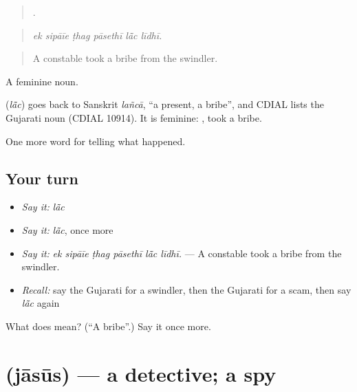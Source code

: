 \begin{quote}
     .
\end{quote}

\begin{quote}
\emph{ek sipāīe ṭhag pāsethī lā̃c līdhī.}
\end{quote}

\begin{quote}
A constable took a bribe from the swindler.
\end{quote}

A feminine noun.

\begin{cousinweb}
\textbf{} (\emph{lā̃c}) goes back to Sanskrit \emph{lañcā}, \textquotedblleft{}a present, a bribe\textquotedblright{}, and CDIAL lists the Gujarati noun (CDIAL 10914). It is feminine: \textbf{ }, took a bribe.
\end{cousinweb}

\begin{grammarlens}[title={What you've built}]
One more word for telling what happened.
\end{grammarlens}

\subsection*{Your turn}
\begin{itemize}
\raggedright
  \item \emph{Say it:} \emph{lā̃c}
  \item \emph{Say it:} \emph{lā̃c}, once more
  \item \emph{Say it:} \emph{ek sipāīe ṭhag pāsethī lā̃c līdhī.} — A constable took a bribe from the swindler.
  \item \emph{Recall:} say the Gujarati for a swindler, then the Gujarati for a scam, then say \emph{lā̃c} again
\end{itemize}

\begin{tcolorbox}[breakable,colback=teal!4,colframe=teal!35!black,title={Before you move on}]
What does  mean? (\textquotedblleft{}A bribe\textquotedblright{}.) Say it once more.
\end{tcolorbox}
\section[\texorpdfstring{\gu{જાસૂસ} (jāsūs)}{જાસૂસ (jāsūs)}]{ (jāsūs) — a detective; a spy}

